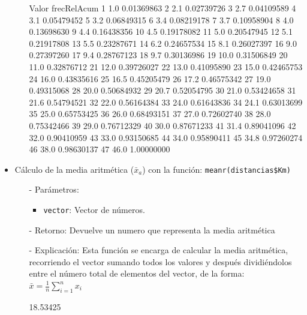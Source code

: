 \documentclass[a4paper, 12pt]{article}
\begin{document}
\begin{itemize}
\begin{itemize}
\begin{Schunk}
\begin{Soutput}
   Valor frecRelAcum
1    1.0  0.01369863
2    2.1  0.02739726
3    2.7  0.04109589
4    3.1  0.05479452
5    3.2  0.06849315
6    3.4  0.08219178
7    3.7  0.10958904
8    4.0  0.13698630
9    4.4  0.16438356
10   4.5  0.19178082
11   5.0  0.20547945
12   5.1  0.21917808
13   5.5  0.23287671
14   6.2  0.24657534
15   8.1  0.26027397
16   9.0  0.27397260
17   9.4  0.28767123
18   9.7  0.30136986
19  10.0  0.31506849
20  11.0  0.32876712
21  12.0  0.39726027
22  13.0  0.41095890
23  15.0  0.42465753
24  16.0  0.43835616
25  16.5  0.45205479
26  17.2  0.46575342
27  19.0  0.49315068
28  20.0  0.50684932
29  20.7  0.52054795
30  21.0  0.53424658
31  21.6  0.54794521
32  22.0  0.56164384
33  24.0  0.61643836
34  24.1  0.63013699
35  25.0  0.65753425
36  26.0  0.68493151
37  27.0  0.72602740
38  28.0  0.75342466
39  29.0  0.76712329
40  30.0  0.87671233
41  31.4  0.89041096
42  32.0  0.90410959
43  33.0  0.93150685
44  34.0  0.95890411
45  34.8  0.97260274
46  38.0  0.98630137
47  46.0  1.00000000
\end{Soutput}
\end{Schunk}
		\end{itemize}
		
		\item Cálculo de la media aritmética (\texttt{$\bar{x}_{a}$}) con la función: \texttt{meanr(distancias\$Km)}
		\begin{itemize}
			\item[-] Parámetros: 
			\begin{itemize}
				\item \texttt{vector}: Vector de números.
			\end{itemize}
			
			\item[-] Retorno: Devuelve un numero que representa la media aritmética 
			
			\item[-] Explicación: Esta función se encarga de calcular la media aritmética, recorriendo el vector sumando todos los valores y después dividiéndolos entre el número total de elementos del vector, de la forma: \\
			$\bar{x} = \frac{1}{n} \sum_{i=1}^{n} x_i$
\begin{Schunk}
\begin{Soutput}
[1] 18.53425
\end{Soutput}
\end{Schunk}
		\end{itemize}
		

\end{itemize}
\end{document}
